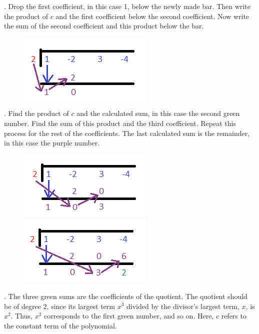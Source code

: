 \documentclass{article}
\begin{document}
    . Drop the first coefficient, in this case 1, below the newly made bar. Then
    write the product of $c$ and the first coefficient below the second coefficient. Now
    write the sum of the second coefficient and this product below the bar. \\

    \begin{figure} [hbt!]
        \centering
        \includegraphics [scale = 0.5] {Resources/Unit3Polynomials/synthdiv3.png}
    \end{figure}

    . Find the product of $c$ and the calculated sum, in this case the second
    green number. Find the sum of this product and the third coefficient. Repeat this
    process for the rest of the coefficients. The last calculated sum is the remainder,
    in this case the purple number.

    \begin{figure} [hbt!]
        \centering
        \includegraphics [scale = 0.5] {Resources/Unit3Polynomials/synthdiv4.png}
        \includegraphics [scale = 0.5] {Resources/Unit3Polynomials/synthdiv5.png}
    \end{figure}

    . The three green sums are the coefficients of the quotient. The quotient
    should be of degree 2, since its largest term $x^3$ divided by the divisor's largest
    term, $x$, is $x^2$. Thus, $x^2$ corresponds to the first green number, and so on.
    Here, $c$ refers to the constant term of the polynomial.
\end{document}
